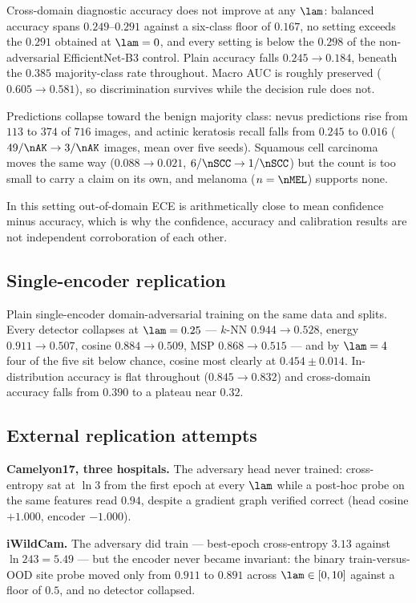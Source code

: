 Cross-domain diagnostic accuracy does not improve at any $\lam$: balanced accuracy
spans $0.249$--$0.291$ against a six-class floor of $0.167$, no setting exceeds the
$0.291$ obtained at $\lam = 0$, and every setting is below the $0.298$ of the
non-adversarial EfficientNet-B3 control. Plain accuracy falls $0.245 \to 0.184$,
beneath the $0.385$ majority-class rate throughout. Macro AUC is roughly preserved
($0.605 \to 0.581$), so discrimination survives while the decision rule does not.

Predictions collapse toward the benign majority class: nevus predictions rise from
$113$ to $374$ of $716$ images, and actinic keratosis recall falls from $0.245$ to
$0.016$ ($49/\nAK \to 3/\nAK$ images, mean over five seeds). Squamous cell carcinoma
moves the same way ($0.088 \to 0.021$, $6/\nSCC \to 1/\nSCC$) but the count is too
small to carry a claim on its own, and melanoma ($n = \nMEL$) supports none.

In this setting out-of-domain ECE is arithmetically close to mean confidence minus
accuracy, which is why the confidence, accuracy and calibration results are not
independent corroboration of each other.

\subsection{Single-encoder replication}
\label{app:single}

Plain single-encoder domain-adversarial training on the same data and splits. Every
detector collapses at $\lam = 0.25$ --- $k$-NN $0.944 \to 0.528$, energy
$0.911 \to 0.507$, cosine $0.884 \to 0.509$, MSP $0.868 \to 0.515$ --- and by
$\lam = 4$ four of the five sit below chance, cosine most clearly at
$0.454 \pm 0.014$. In-distribution accuracy is flat throughout ($0.845 \to 0.832$) and
cross-domain accuracy falls from $0.390$ to a plateau near $0.32$.

\subsection{External replication attempts}
\label{app:external}

\textbf{Camelyon17, three hospitals.} The adversary head never trained:
cross-entropy sat at $\ln 3$ from the first epoch at every $\lam$ while a post-hoc
probe on the same features read $0.94$, despite a gradient graph verified correct
(head cosine $+1.000$, encoder $-1.000$).

\textbf{iWildCam.} The adversary did train --- best-epoch cross-entropy $3.13$ against
$\ln 243 = 5.49$ --- but the encoder never became invariant: the binary
train-versus-OOD site probe moved only from $0.911$ to $0.891$ across
$\lam \in [0, 10]$ against a floor of $0.5$, and no detector collapsed.

